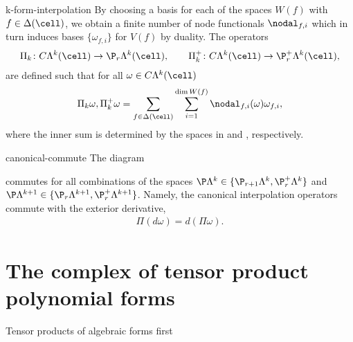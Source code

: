 \begin{Definition}{k-form-interpolation}
  By choosing a basis for each of the spaces $W(f)$ with
  $f\in\Delta(\cell)$, we obtain a finite number of node functionals
  $\nodal_{f,i}$ which in turn induces bases $\{\omega_{f,i}\}$ for $V(f)$ by
  duality.
  The  operators
  \begin{gather}
    \Pi_k\colon C\Lambda^k(\cell) \to \P_r\Lambda^k(\cell),
    \qquad
    \Pi_k^+\colon C\Lambda^k(\cell) \to \P_r^+\Lambda^k(\cell),
  \end{gather}
  are defined such that for all $\omega\in C\Lambda^k(\cell)$
  \begin{gather}
    \Pi_k \omega, \Pi_k^+\omega = \sum_{f\in\Delta(\cell)}
  \sum_{i=1}^{\dim W(f)} \nodal_{f,i}(\omega) \omega_{f,i},
\end{gather}
where the inner sum is determined by the spaces in  and , respectively.
\end{Definition}

\begin{Theorem}{canonical-commute}
  The diagram
  \begin{center}
  \end{center}
  commutes for all combinations of the spaces
  $\P\Lambda^k \in \{\P_{r+1}\Lambda^k,\P_r^+\Lambda^k\}$ and
  $\P\Lambda^{k+1}\in \{\P_r\Lambda^{k+1}, \P_r^+\Lambda^{k+1}\}$.
  Namely, the canonical interpolation operators commute with the
  exterior derivative,
  \begin{gather}
    \Pi(d\omega) = d(\Pi\omega).
  \end{gather}
\end{Theorem}


\section{The complex of tensor product polynomial forms}

\begin{todo}
  Tensor products of algebraic forms first
\end{todo}

